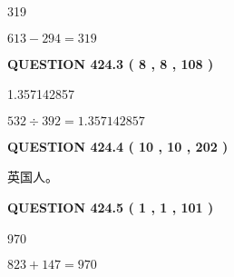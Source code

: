\documentclass{ctexart}
\begin{document}
  
 
 
\noindent{}

319
 
 
 
 
\noindent{}

$ %
613 -  %
294=   %
319$
 
 
  
\vspace{0.2in}
  
{\textbf{\Large{QUESTION
424.3 
 ( 8 , 8 , 108 )
}}}
  
  
 
 
\noindent{}

1.357142857
 
 
 
 
\noindent{}

$ %
532 \div  %
392=   %
1.357142857$
 
 
  
\vspace{0.2in}
  
{\textbf{\Large{QUESTION
424.4 
 ( 10 , 10 , 202 )
}}}
  
  
 
 
\noindent{}
 
 
英国人。
 
 
 
 
  
\vspace{0.2in}
  
{\textbf{\Large{QUESTION
424.5 
 ( 1 , 1 , 101 )
}}}
  
  
 
 
\noindent{}

970
 
 
 
 
\noindent{}

$ %
823 +  %
147=   %
970$
 
 
  
\vspace{0.2in}
  
\end{document}
